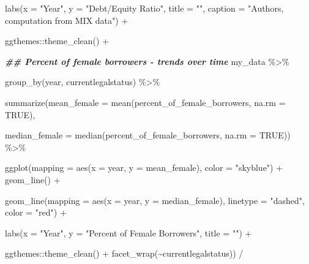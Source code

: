 \documentclass[a4paper,nobind]{templates/ociamthesis}
\newenvironment{Shaded}{\begin{snugshade}}{\end{snugshade}}
\newcommand{\AttributeTok}[1]{\textcolor[rgb]{0.77,0.63,0.00}{#1}}
\newcommand{\ConstantTok}[1]{\textcolor[rgb]{0.00,0.00,0.00}{#1}}
\newcommand{\DocumentationTok}[1]{\textcolor[rgb]{0.56,0.35,0.01}{\textbf{\textit{#1}}}}
\newcommand{\FunctionTok}[1]{\textcolor[rgb]{0.00,0.00,0.00}{#1}}
\newcommand{\NormalTok}[1]{#1}
\newcommand{\SpecialCharTok}[1]{\textcolor[rgb]{0.00,0.00,0.00}{#1}}
\newcommand{\StringTok}[1]{\textcolor[rgb]{0.31,0.60,0.02}{#1}}
\renewenvironment{Shaded}
{
  \vspace{10pt}%
  \begin{snugshade}%
}{%
  \end{snugshade}%
  \vspace{8pt}%
}
\begin{document}
\begin{landscape}
\begin{Shaded}
\begin{Highlighting}[]
  \FunctionTok{labs}\NormalTok{(}\AttributeTok{x =} \StringTok{"Year"}\NormalTok{, }\AttributeTok{y =} \StringTok{"Debt/Equity Ratio"}\NormalTok{, }\AttributeTok{title =} \StringTok{""}\NormalTok{, }
       \AttributeTok{caption =} \StringTok{"Authors, computation from MIX data"}\NormalTok{) }\SpecialCharTok{+} 
  
\NormalTok{  ggthemes}\SpecialCharTok{::}\FunctionTok{theme\_clean}\NormalTok{() }\SpecialCharTok{+}




\DocumentationTok{\#\# Percent of female borrowers {-} trends over time}
\NormalTok{my\_data }\SpecialCharTok{\%\textgreater{}\%} 
  
  \FunctionTok{group\_by}\NormalTok{(year, currentlegalstatus) }\SpecialCharTok{\%\textgreater{}\%} 
  
  \FunctionTok{summarize}\NormalTok{(}\AttributeTok{mean\_female =} \FunctionTok{mean}\NormalTok{(percent\_of\_female\_borrowers, }\AttributeTok{na.rm =} \ConstantTok{TRUE}\NormalTok{), }
                               
  \AttributeTok{median\_female =} \FunctionTok{median}\NormalTok{(percent\_of\_female\_borrowers, }\AttributeTok{na.rm =} \ConstantTok{TRUE}\NormalTok{)) }\SpecialCharTok{\%\textgreater{}\%} 
  
  \FunctionTok{ggplot}\NormalTok{(}\AttributeTok{mapping =} \FunctionTok{aes}\NormalTok{(}\AttributeTok{x =}\NormalTok{ year, }\AttributeTok{y =}\NormalTok{ mean\_female), }\AttributeTok{color =} \StringTok{"skyblue"}\NormalTok{) }\SpecialCharTok{+} \FunctionTok{geom\_line}\NormalTok{() }\SpecialCharTok{+}
  
  \FunctionTok{geom\_line}\NormalTok{(}\AttributeTok{mapping =} \FunctionTok{aes}\NormalTok{(}\AttributeTok{x =}\NormalTok{ year, }\AttributeTok{y =}\NormalTok{ median\_female), }\AttributeTok{linetype =} \StringTok{"dashed"}\NormalTok{, }\AttributeTok{color =} \StringTok{"red"}\NormalTok{) }\SpecialCharTok{+}
  
  \FunctionTok{labs}\NormalTok{(}\AttributeTok{x =} \StringTok{"Year"}\NormalTok{, }\AttributeTok{y =} \StringTok{"Percent of Female Borrowers"}\NormalTok{, }\AttributeTok{title =} \StringTok{""}\NormalTok{) }\SpecialCharTok{+} 
  
\NormalTok{  ggthemes}\SpecialCharTok{::}\FunctionTok{theme\_clean}\NormalTok{() }\SpecialCharTok{+} \FunctionTok{facet\_wrap}\NormalTok{(}\SpecialCharTok{\textasciitilde{}}\NormalTok{currentlegalstatus)) }\SpecialCharTok{/}




\end{Highlighting}
\end{Shaded}
\end{landscape}
\end{document}
